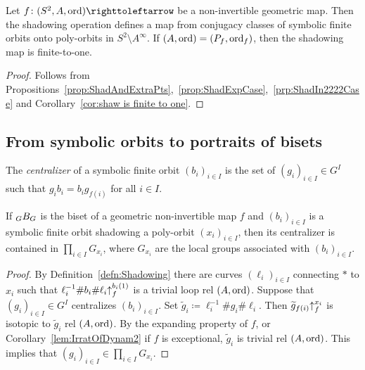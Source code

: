 \documentclass{amsart}
\newcommand\wtg{{\widetilde g}}
\begin{document}
\begin{thm}\label{thm:ShadowEquivalence}
  Let $f\colon(S^2,A,\ord)\selfmap$ be a non-invertible geometric
  map. Then the shadowing operation defines a map from conjugacy
  classes of symbolic finite orbits onto poly-orbits in
  $S^2\setminus A^\infty$. If $(A,\operatorname{ord})=(P_f,\operatorname{ord}_f)$, then the shadowing map is finite-to-one.
\end{thm}
\begin{proof}
  Follows from
  Propositions~\ref{prop:ShadAndExtraPts},~\ref{prop:ShadExpCase},~\ref{prp:ShadIn2222Case}
  and Corollary~\ref{cor:shaw is finite to one}.
\end{proof}

\subsection{From symbolic orbits to portraits of bisets}
The \emph{centralizer} of a symbolic finite orbit $(b_i)_{i\in I}$ is
the set of $(g_i)_{i\in I}\in G^I$ such that $g_i b_i=b_i g_{f(i)}$
for all $i\in I$.
\begin{lem}\label{lem:Zsfi}
  If $\subscript G B_G$ is the biset of a geometric non-invertible map
  $f$ and $(b_i)_{i\in I}$ is a symbolic finite orbit shadowing a
  poly-orbit $(x_i)_{i\in I}$, then its centralizer is contained in
  $\prod_{i\in I}G_{x_i}$, where $G_{x_i}$ are the local groups
  associated with $(b_i)_{i\in I}$.
\end{lem}
\begin{proof}
  By Definition~\ref{defn:Shadowing} there are curves
  $(\ell_i)_{i\in I}$ connecting $*$ to $x_i$ such that
  $\ell_i^{-1}\#b_i\#\ell_i {\uparrow}_{f}^{b_i(1)}$ is a trivial loop rel
  $(A,\operatorname{ord})$. Suppose that $(g_i)_{i\in I}\in G^I$ centralizes
  $(b_i)_{i\in I}$. Set
  $\wtg_i \coloneqq \ell_i^{-1}\#g_i \#\ell_i$. Then
  $\wtg_{f(i)}\lift{f}{x_i}$ is isotopic to $\wtg_i$
  rel $(A,\operatorname{ord})$. By the expanding property of $f$, or
  Corollary~\ref{lem:IrratOfDynam2} if $f$ is exceptional,
  $\wtg_i$ is trivial rel $(A,\operatorname{ord})$. This implies that
  $(g_i)_{i\in I} \in\prod_{i\in I}G_{x_i}$.
\end{proof}
\end{document}
